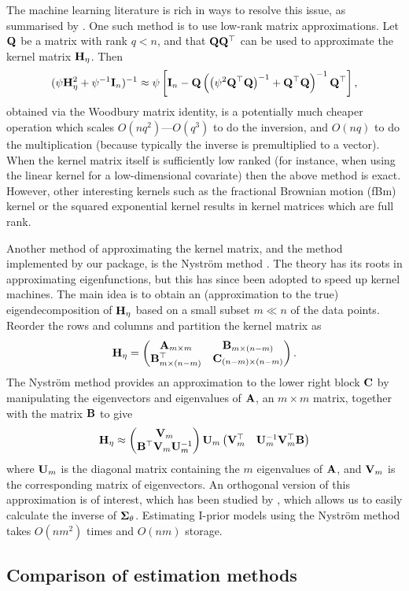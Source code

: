 The machine learning literature is rich in ways to resolve this issue, as summarised by \cite{quinonero2005unifying}.
One such method is to use low-rank matrix approximations.
Let ${\mathbf Q}$ be a matrix with rank $q < n$, and that ${\mathbf Q}{\mathbf Q}^\top$ can be used to approximate the kernel matrix ${\mathbf H}_\eta$.
Then
%
\[
  (\psi{\mathbf H}_\eta^2 + \psi^{-1}{\mathbf I}_n)^{-1} \approx
  \psi\left[
  {\mathbf I}_n -
  {\mathbf Q}\left( \big(\psi^2{\mathbf Q}^\top{\mathbf Q}\big)^{-1} +{\mathbf Q}^\top{\mathbf Q} \right)^{-1} {\mathbf Q}^\top
  \right],
\]
%
obtained via the Woodbury matrix identity, is a potentially much cheaper operation which scales $O(nq^2)$---$O(q^3)$ to do the inversion, and $O(nq)$ to do the multiplication (because typically the inverse is premultiplied to a vector).
When the kernel matrix itself is sufficiently low ranked (for instance, when using the linear kernel for a low-dimensional covariate) then the above method is exact.
However, other interesting kernels such as the fractional Brownian motion (fBm) kernel or the squared exponential kernel results in kernel matrices which are full rank.

Another method of approximating the kernel matrix, and the method implemented by our package, is the Nystr\"om method \citep{williams2001using}.
The theory has its roots in approximating eigenfunctions, but this has since been adopted to speed up kernel machines.
The main idea is to obtain an (approximation to the true) eigendecomposition of ${\mathbf H}_\eta$ based on a small subset $m \ll n$ of the data points.
Reorder the rows and columns and partition the kernel matrix as
%
\[
  {\mathbf H}_\eta =
  \begin{pmatrix}
    {\mathbf A}_{m\times m}         & {\mathbf B}_{m \times (n-m)} \\
    {\mathbf B}_{m \times (n-m)}^\top  & {\mathbf C}_{(n-m) \times (n-m)} \\
  \end{pmatrix}.
\]
%
The Nystr\"om method provides an approximation to the lower right block ${\mathbf C}$ by manipulating the eigenvectors and eigenvalues of ${\mathbf A}$, an $m \times m$ matrix, together with the matrix ${\mathbf B}$ to give
%
\[
  {\mathbf H}_\eta \approx
  \begin{pmatrix}
    {\mathbf V}_m \\
    {\mathbf B}^\top{\mathbf V}_m{\mathbf U}_m^{-1}
  \end{pmatrix}
  {\mathbf U}_m
  \begin{pmatrix}
    {\mathbf V}_m^\top & {\mathbf U}_m^{-1}{\mathbf V}_m^\top{\mathbf B}
  \end{pmatrix}
\]
%
where ${\mathbf U}_m$ is the diagonal matrix containing the $m$ eigenvalues of ${\mathbf A}$, and ${\mathbf V}_m$ is the corresponding matrix of eigenvectors.
An orthogonal version of this approximation is of interest, which has been studied by \cite{fowlkes2001efficient}, which allows us to easily calculate the inverse of ${\bm\Sigma}_\theta$.
Estimating I-prior models using the Nystr\"om method takes $O(nm^2)$ times and $O(nm)$ storage.


\subsection{Comparison of estimation methods}
